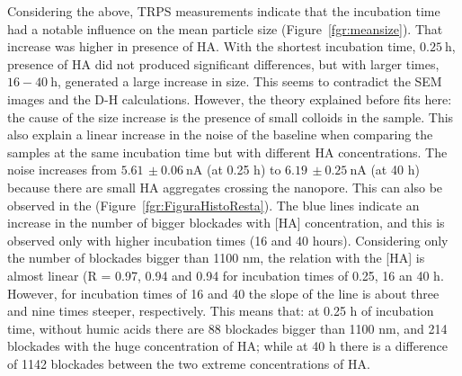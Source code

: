 \documentclass[journal=langd5,manuscript=article]{achemso}
\begin{document}
Considering the above, TRPS measurements indicate that the incubation time had a notable influence on the mean particle size (Figure~\ref{fgr:meansize}). That increase was higher in presence of HA. With the shortest incubation time, $0.25~\mathrm{h}$, presence of HA did not produced significant differences, but with larger times, $16 - 40~\mathrm{h}$, generated a large increase in size. This seems to contradict the SEM images and the D-H calculations. However, the theory explained before fits here: the cause of the size increase is the presence of small colloids in the sample. This also explain a linear increase in the noise of the baseline when comparing the samples at the same incubation time but with different HA concentrations. The noise increases from $5.61\,\pm 0.06~\mathrm{nA}$ (at 0.25 h) to $6.19\,\pm 0.25~\mathrm{nA}$ (at 40 h) because there are small HA aggregates crossing the nanopore. This can also be observed in the (Figure~\ref{fgr:FiguraHistoResta}). The blue lines indicate an increase in the number of bigger blockades with [HA] concentration, and this is observed only with higher incubation times (16 and 40 hours). Considering only the number of blockades bigger than 1100 nm, the relation with the [HA] is almost linear (R = 0.97, 0.94 and 0.94 for incubation times of 0.25, 16 an 40 h. However, for incubation times of 16 and 40 the slope of the line is about three and nine times steeper, respectively. This means that: at 0.25 h of incubation time, without humic acids there are 88 blockades bigger than 1100 nm, and 214 blockades with the huge concentration of HA; while at 40 h there is a difference of 1142 blockades between the two extreme concentrations of HA.
\end{document}
